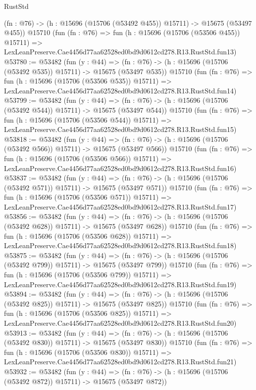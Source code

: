 \begin{lexlean}{RustStd}
\begin{coremodule}
    (fn : @76) -> (h : @15696 (@15706 (@53492 @455)) @15711) -> @15675 (@53497 @455))
    @15710
    (fun (fn : @76) =>
    fun (h : @15696 (@15706 (@53506 @455)) @15711) =>
    LexLeanPreserve.Cae4456d77aa62528ed0bd9d0612cd278.R13.RustStd.fun13)
@53780 := @53482
    (fun (y : @44) =>
    (fn : @76) -> (h : @15696 (@15706 (@53492 @535)) @15711) -> @15675 (@53497 @535))
    @15710
    (fun (fn : @76) =>
    fun (h : @15696 (@15706 (@53506 @535)) @15711) =>
    LexLeanPreserve.Cae4456d77aa62528ed0bd9d0612cd278.R13.RustStd.fun14)
@53799 := @53482
    (fun (y : @44) =>
    (fn : @76) -> (h : @15696 (@15706 (@53492 @544)) @15711) -> @15675 (@53497 @544))
    @15710
    (fun (fn : @76) =>
    fun (h : @15696 (@15706 (@53506 @544)) @15711) =>
    LexLeanPreserve.Cae4456d77aa62528ed0bd9d0612cd278.R13.RustStd.fun15)
@53818 := @53482
    (fun (y : @44) =>
    (fn : @76) -> (h : @15696 (@15706 (@53492 @566)) @15711) -> @15675 (@53497 @566))
    @15710
    (fun (fn : @76) =>
    fun (h : @15696 (@15706 (@53506 @566)) @15711) =>
    LexLeanPreserve.Cae4456d77aa62528ed0bd9d0612cd278.R13.RustStd.fun16)
@53837 := @53482
    (fun (y : @44) =>
    (fn : @76) -> (h : @15696 (@15706 (@53492 @571)) @15711) -> @15675 (@53497 @571))
    @15710
    (fun (fn : @76) =>
    fun (h : @15696 (@15706 (@53506 @571)) @15711) =>
    LexLeanPreserve.Cae4456d77aa62528ed0bd9d0612cd278.R13.RustStd.fun17)
@53856 := @53482
    (fun (y : @44) =>
    (fn : @76) -> (h : @15696 (@15706 (@53492 @628)) @15711) -> @15675 (@53497 @628))
    @15710
    (fun (fn : @76) =>
    fun (h : @15696 (@15706 (@53506 @628)) @15711) =>
    LexLeanPreserve.Cae4456d77aa62528ed0bd9d0612cd278.R13.RustStd.fun18)
@53875 := @53482
    (fun (y : @44) =>
    (fn : @76) -> (h : @15696 (@15706 (@53492 @799)) @15711) -> @15675 (@53497 @799))
    @15710
    (fun (fn : @76) =>
    fun (h : @15696 (@15706 (@53506 @799)) @15711) =>
    LexLeanPreserve.Cae4456d77aa62528ed0bd9d0612cd278.R13.RustStd.fun19)
@53894 := @53482
    (fun (y : @44) =>
    (fn : @76) -> (h : @15696 (@15706 (@53492 @825)) @15711) -> @15675 (@53497 @825))
    @15710
    (fun (fn : @76) =>
    fun (h : @15696 (@15706 (@53506 @825)) @15711) =>
    LexLeanPreserve.Cae4456d77aa62528ed0bd9d0612cd278.R13.RustStd.fun20)
@53913 := @53482
    (fun (y : @44) =>
    (fn : @76) -> (h : @15696 (@15706 (@53492 @830)) @15711) -> @15675 (@53497 @830))
    @15710
    (fun (fn : @76) =>
    fun (h : @15696 (@15706 (@53506 @830)) @15711) =>
    LexLeanPreserve.Cae4456d77aa62528ed0bd9d0612cd278.R13.RustStd.fun21)
@53932 := @53482
    (fun (y : @44) =>
    (fn : @76) -> (h : @15696 (@15706 (@53492 @872)) @15711) -> @15675 (@53497 @872))

\end{coremodule}
\end{lexlean}
